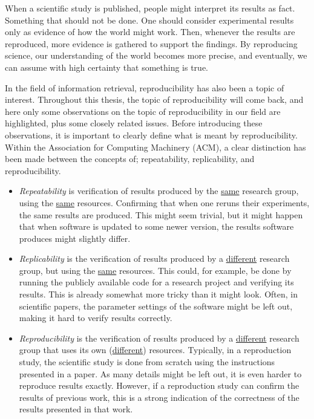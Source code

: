 When a scientific study is published, people might interpret its results as fact. Something that should not be done. One should consider experimental results only as evidence of how the world might work. Then, whenever the results are reproduced, more evidence is gathered to support the findings. By reproducing science, our understanding of the world becomes more precise, and eventually, we can assume with high certainty that something is true. 

In the field of information retrieval, reproducibility has also been a topic of interest. Throughout this thesis, the topic of reproducibility will come back, and here only some observations on the topic of reproducibility in our field are highlighted, plus some closely related issues. Before introducing these observations, it is important to clearly define what is meant by reproducibility. Within the Association for Computing Machinery (ACM), a clear distinction has been made between the concepts of; repeatability, replicability, and reproducibility. 
\begin{itemize}
	\item \emph{Repeatability} is verification of results produced by the \underline{same} research group, using the \underline{same} resources. Confirming that when one reruns their experiments, the same results are produced. This might seem trivial, but it might happen that when software is updated to some newer version, the results software produces might slightly differ. 
	\item \emph{Replicability} is the verification of results produced by a \underline{different} research group, but using the \underline{same} resources. This could, for example, be done by running the publicly available code for a research project and verifying its results. This is already somewhat more tricky than it might look. Often, in scientific papers, the parameter settings of the software might be left out, making it hard to verify results correctly. 
	\item \emph{Reproducibility} is the verification of results produced by a \underline{different} research group that uses its own (\underline{different}) resources. Typically, in a reproduction study, the scientific study is done from scratch using the instructions presented in a paper. As many details might be left out, it is even harder to reproduce results exactly. However, if a reproduction study can confirm the results of previous work, this is a strong indication of the correctness of the results presented in that work.
\end{itemize}

